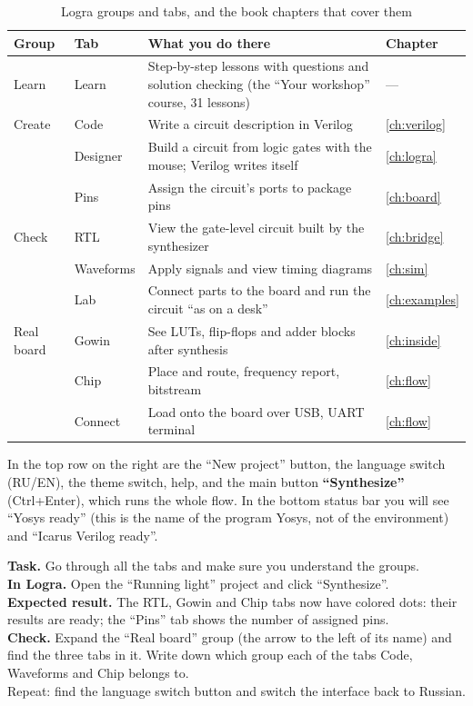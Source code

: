\begin{table}[H]
\centering
\caption{Logra groups and tabs, and the book chapters that cover them}
\small
\begin{tabularx}{\textwidth}{l l X l}
\toprule
\textbf{Group} & \textbf{Tab} & \textbf{What you do there} & \textbf{Chapter} \\
\midrule
Learn & Learn & Step-by-step lessons with questions and solution checking (the ``Your workshop'' course, 31 lessons) & --- \\
\midrule
Create & Code & Write a circuit description in Verilog & \ref{ch:verilog} \\
 & Designer & Build a circuit from logic gates with the mouse; Verilog writes itself & \ref{ch:logra} \\
 & Pins & Assign the circuit's ports to package pins & \ref{ch:board} \\
\midrule
Check & RTL & View the gate-level circuit built by the synthesizer & \ref{ch:bridge} \\
 & Waveforms & Apply signals and view timing diagrams & \ref{ch:sim} \\
 & Lab & Connect parts to the board and run the circuit ``as on a desk'' & \ref{ch:examples} \\
\midrule
Real board & Gowin & See LUTs, flip-flops and adder blocks after synthesis & \ref{ch:inside} \\
 & Chip & Place and route, frequency report, bitstream & \ref{ch:flow} \\
 & Connect & Load onto the board over USB, UART terminal & \ref{ch:flow} \\
\bottomrule
\end{tabularx}
\end{table}

In the top row on the right are the ``New project'' button, the language
switch (RU/EN), the theme switch, help, and the main button
\textbf{``Synthesize''} (Ctrl+Enter), which runs the whole flow. In
the bottom status bar you will see ``Yosys ready'' (this is the name of the program
Yosys, not of the environment) and ``Icarus Verilog ready''.

\begin{diybox}
\textbf{Task.} Go through all the tabs and make sure you understand the
groups.\\
\textbf{In Logra.} Open the ``Running light'' project and click ``Synthesize''.\\
\textbf{Expected result.} The RTL, Gowin and Chip tabs now have
colored dots: their results are ready; the ``Pins'' tab shows the number of assigned pins.\\
\textbf{Check.} Expand the ``Real board'' group (the arrow to the left of its
name) and find the three tabs in it. Write down which group each of the tabs
Code, Waveforms and Chip belongs to.\\
 Repeat: find the language switch button and switch the interface back to Russian.
\end{diybox}

